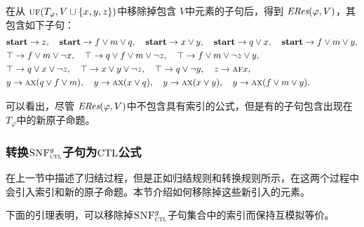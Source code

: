 \begin{example}
	在从 $\textsc{uf}(T_\varphi, V\cup \{x,y,z\})$中移除掉包含 $V$中元素的子句后，得到 $\emph{ERes}(\varphi,V)$，其包含如下子句：
	\begin{align*}%
		&\start\rto z, \quad \start \rto f\vee m \vee q, \quad  \start \rto x \vee y, \quad \start \rto q \vee x, \quad	\start \rto f\vee m \vee y, \\
		& \top \rto f \vee m \vee \neg x, \quad		\top \rto q \vee f \vee m\vee \neg z,
		\quad  	\top \rto f \vee m \vee \neg z \vee y,\\
		& \top \rto q \vee x\vee \neg z, \quad 	\top \rto x \vee y \vee \neg z, \quad 	\top \rto q\vee\neg y , \quad z \rto \ALL \FUTURE x, \\
		& y \rto \ALL\NEXT(q \vee f\vee m), \quad  y \rto \ALL\NEXT(x\vee q), \quad y \rto \ALL \NEXT(x\vee y),\quad 	y \rto \ALL\NEXT(f\vee m\vee y).
	\end{align*}
	
	可以看出，尽管 $\emph{ERes}(\varphi,V)$中不包含具有索引的公式，但是有的子句包含出现在 $T_\varphi$中的新原子命题。
\end{example}


\subsubsection{转换${\textsc{SNF}_{\textsc{ctl}}^g}$子句为$\textrm{CTL}$公式}
\label{cha5:subsubsec:remIndex}
在上一节中描述了归结过程，但是正如归结规则和转换规则所示，在这两个过程中会引入索引和新的原子命题。本节介绍如何移除掉这些新引入的元素。

下面的引理表明，可以移除掉${\textsc{SNF}_{\textsc{ctl}}^g}$子句集合中的索引而保持互模拟等价。

